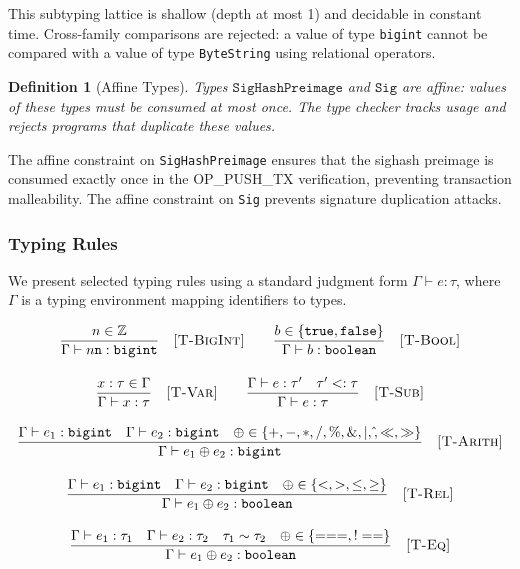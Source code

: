 \documentclass[11pt,a4paper]{article}
\newtheorem{definition}[theorem]{Definition}
\newcommand{\bs}{\texttt{ByteString}}
\newcommand{\bigintty}{\texttt{bigint}}
\newcommand{\boolty}{\texttt{boolean}}
\newcommand{\subtype}{\mathrel{<:}}
\begin{document}
This subtyping lattice is shallow (depth at most 1) and decidable in constant
time. Cross-family comparisons are rejected: a value of type \bigintty{}
cannot be compared with a value of type \bs{} using relational operators.

\begin{definition}[Affine Types]
Types $\texttt{SigHashPreimage}$ and $\texttt{Sig}$ are \emph{affine}: values
of these types must be consumed at most once. The type checker tracks usage
and rejects programs that duplicate these values.
\end{definition}

The affine constraint on \texttt{SigHashPreimage} ensures that the sighash
preimage is consumed exactly once in the OP\_PUSH\_TX verification, preventing
transaction malleability. The affine constraint on \texttt{Sig} prevents
signature duplication attacks.

\subsubsection{Typing Rules}

We present selected typing rules using a standard judgment form
$\Gamma \vdash e : \tau$, where $\Gamma$ is a typing environment mapping
identifiers to types.

\begin{gather}
\frac{n \in \mathbb{Z}}{\Gamma \vdash n\texttt{n} : \bigintty}
\quad \textsc{[T-BigInt]}
\qquad
\frac{b \in \{\texttt{true}, \texttt{false}\}}{\Gamma \vdash b : \boolty}
\quad \textsc{[T-Bool]}
\\[1em]
\frac{x : \tau \in \Gamma}{\Gamma \vdash x : \tau}
\quad \textsc{[T-Var]}
\qquad
\frac{\Gamma \vdash e : \tau' \quad \tau' \subtype \tau}{\Gamma \vdash e : \tau}
\quad \textsc{[T-Sub]}
\\[1em]
\frac{
  \Gamma \vdash e_1 : \bigintty \quad
  \Gamma \vdash e_2 : \bigintty \quad
  \oplus \in \{+, -, *, /, \%, \mathbin{\&}, |, \hat{}, \ll, \gg\}
}{
  \Gamma \vdash e_1 \oplus e_2 : \bigintty
}
\quad \textsc{[T-Arith]}
\\[1em]
\frac{
  \Gamma \vdash e_1 : \bigintty \quad
  \Gamma \vdash e_2 : \bigintty \quad
  \oplus \in \{<, >, \leq, \geq\}
}{
  \Gamma \vdash e_1 \oplus e_2 : \boolty
}
\quad \textsc{[T-Rel]}
\\[1em]
\frac{
  \Gamma \vdash e_1 : \tau_1 \quad
  \Gamma \vdash e_2 : \tau_2 \quad
  \tau_1 \sim \tau_2 \quad
  \oplus \in \{===, !==\}
}{
  \Gamma \vdash e_1 \oplus e_2 : \boolty
}
\quad \textsc{[T-Eq]}
\end{gather}
\end{document}
